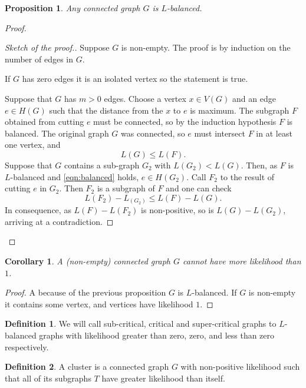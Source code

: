 \documentclass[11pt,notitlepage,a4paper]{article}
\newtheorem{proposition}{Proposition}[section]
\newtheorem{corollary}{Corollary}[section]
\theoremstyle{definition}
\newtheorem{definition}{Definition}[section]
\begin{document}
\begin{proposition} \label{prop:balanced}
	Any connected graph $G$ is $L$-balanced. 
\end{proposition}
\begin{proof}
	\begin{proof}[Sketch of the proof.]
		Suppose $G$ is non-empty.
		The proof is by induction on the number of edges in $G$. 
		\item If $G$ has zero edges it is an isolated vertex so the statement is true.
		\item Suppose that $G$ has $m>0$ edges. Choose a vertex $x\in V(G)$ and
		an edge $e\in H(G)$ such that the distance from the $x$ to $e$ is maximum. 
		The subgraph $F$ obtained from cutting $e$ must be connected, so by the
		induction hypothesis $F$ is balanced. 
		The original graph $G$ was connected, 
		so $e$ must intersect $F$ in at least one vertex, and
		\begin{equation}\label{eqn:balanced}
		L(G)\leq L(F).
		\end{equation}
		Suppose that $G$ contains a sub-graph $G_2$ with 
		$L(G_2)<L(G)$. Then, as $F$ is $L$-balanced and
		\ref{eqn:balanced} holds, $e\in H(G_2)$. Call $F_2$
		to the result of cutting $e$ in $G_2$. Then
		$F_2$ is a subgraph of $F$ and one can check
		\[ L(F_2) - L_(G_2) \leq L(F)-L(G).\]
		In consequence, as $L(F)-L(F_2)$ is non-positive, 
		so is $L(G)-L(G_2)$, arriving at a contradiction.
	\end{proof}
\end{proof}


\begin{corollary}
	A (non-empty) connected graph $G$ cannot have more likelihood than $1$.
\end{corollary}
\begin{proof}
	A because of the previous proposition $G$ is $L$-balanced.
	If $G$ is non-empty it contains some vertex,
	and vertices have likelihood $1$.
\end{proof}

\begin{definition} 
	We will call sub-critical, critical and super-critical
	graphs to $L$-balanced graphs with likelihood greater than
	zero, zero, and less than zero respectively. 
\end{definition}

\begin{definition}
	A cluster is a connected graph $G$ with non-positive likelihood such 
	that all of its subgraphs $T$ have greater likelihood
	than itself. 
\end{definition}
\end{document}
